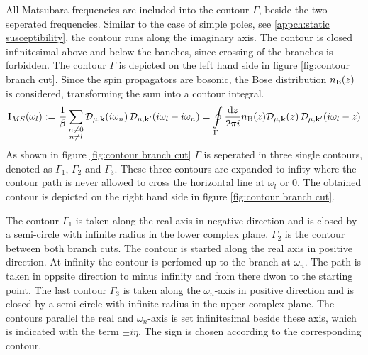 All Matsubara frequencies are included into the contour $\Gamma$, beside the two seperated frequencies.
Similar to the case of simple poles, see \ref{appch:static susceptibility}, the contour runs along the imaginary axis.
The contour is closed infinitesimal above and below the banches, since crossing of the branches is forbidden.
The contour $\Gamma$ is depicted on the left hand side in figure \ref{fig:contour branch cut}.
Since the spin propagators are bosonic, the Bose distribution $n_{\mathrm{B}}(z)$ is considered, transforming the sum into a contour integral.
%
\begin{align}
	\mathrm{I}_{MS}(\omega_{l}) := 
		\frac{1}{\beta} \sum\limits_{\substack{n \neq 0 \\ n \neq l}} \mathcal{D}_{\mu,\vb{k}}(i\omega_{n}) \, \mathcal{D}_{\mu,\vb{k}'}(i\omega_{l}-i\omega_{n})
		=
		\oint\limits_{\Gamma} \frac{\dd{z}}{2\pi i} n_{\mathrm{B}}(z) \mathcal{D}_{\mu,\vb{k}}(z) \, \mathcal{D}_{\mu,\vb{k}'}(i\omega_{l}-z)
\end{align}
%
As shown in figure \ref{fig:contour branch cut} $\Gamma$ is seperated in three single contours, denoted as $\Gamma_{1}$, $\Gamma_{2}$ and $\Gamma_{3}$.
These three contours are expanded to infity where the contour path is never allowed to cross the horizontal line at $\omega_{l}$ or $0$.
The obtained contour is depicted on the right hand side in figure \ref{fig:contour branch cut}.

The contour $\Gamma_{1}$ is taken along the real axis in negative direction and is closed by a semi-circle with infinite radius in the lower complex plane.
$\Gamma_{2}$ is the contour between both branch cuts.
The contour is started along the real axis in positive direction.
At infinity the contour is perfomed up to the branch at $\omega_{n}$.
The path is taken in oppsite direction to minus infinity and from there dwon to the starting point.
The last contour $\Gamma_{3}$ is taken along the $\omega_{n}$-axis in positive direction and is closed by a semi-circle with infinite radius in the upper complex plane.
The contours parallel the real and $\omega_{n}$-axis is set infinitesimal beside these axis, which is indicated with the term $\pm i\eta$.
The sign is chosen according to the corresponding contour.

